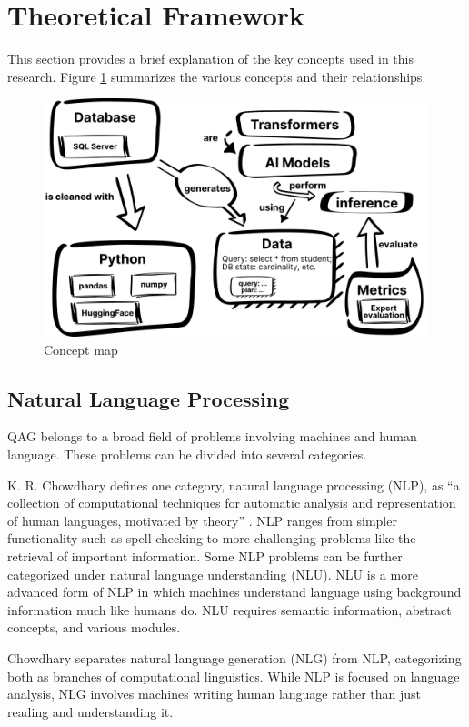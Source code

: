 \section{Theoretical Framework}\label{sec:theoryFrames}
This section provides a brief explanation of the key concepts used in this research. Figure \ref{fig:conceptMap} summarizes the various concepts and their relationships.

\begin{figure}[ht]
  \centering
  \includegraphics[width=\textwidth]{figures/llamaInferenceConceptMap.png}
  \caption{Concept map}
  \label{fig:conceptMap}
\end{figure}


\subsection{Natural Language Processing}
QAG belongs to a broad field of problems involving machines and human language. These problems can be divided into several categories.

K. R. Chowdhary defines one category, natural language processing (NLP), as ``a collection of computational techniques for automatic analysis and
representation of human languages, motivated by theory'' \cite{chowdhary2020}. NLP ranges from simpler functionality such as spell checking to more challenging problems like the retrieval of important information. Some NLP problems can be further categorized under natural language understanding (NLU). NLU is a more advanced form of NLP in which machines understand language using background information much like humans do. NLU requires semantic information, abstract concepts, and various modules.

Chowdhary separates natural language generation (NLG) from NLP, categorizing both as branches of computational linguistics. While NLP is focused on language analysis, NLG involves machines writing human language rather than just reading and understanding it.

